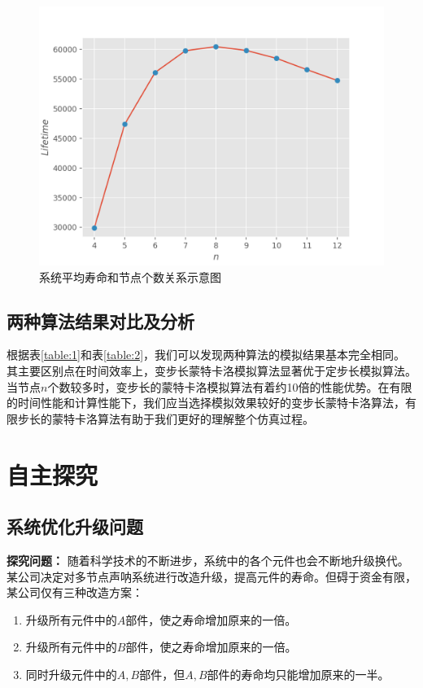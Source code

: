 \documentclass[10.5pt,twocolumn]{jbuaa}
\begin{document}
\begin{figure}[H]
	\centering
	\includegraphics[scale = 0.6]{fig5}
	\caption{系统平均寿命和节点个数关系示意图}
	\label{fig:7}
\end{figure}

\subsection{两种算法结果对比及分析}
根据表\ref{table:1}和表\ref{table:2}，我们可以发现两种算法的模拟结果基本完全相同。其主要区别点在时间效率上，变步长蒙特卡洛模拟算法显著优于定步长模拟算法。当节点$n$个数较多时，变步长的蒙特卡洛模拟算法有着约10倍的性能优势。在有限的时间性能和计算性能下，我们应当选择模拟效果较好的变步长蒙特卡洛算法，有限步长的蒙特卡洛算法有助于我们更好的理解整个仿真过程。
\section{自主探究}

\subsection{系统优化升级问题}
\textbf{探究问题：} 随着科学技术的不断进步，系统中的各个元件也会不断地升级换代。某公司决定对多节点声呐系统进行改造升级，提高元件的寿命。但碍于资金有限，某公司仅有三种改造方案：
\begin{enumerate}
	\item 升级所有元件中的$A$部件，使之寿命增加原来的一倍。
	\item 升级所有元件中的$B$部件，使之寿命增加原来的一倍。
	\item 同时升级元件中的$A, B$部件，但$A, B$部件的寿命均只能增加原来的一半。
\end{enumerate}
\end{document}
